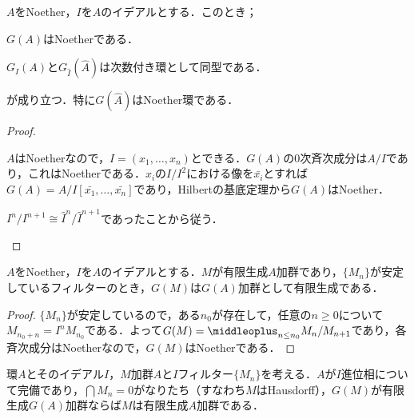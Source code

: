 \begin{prop}\label{prop:G(hat{A})はNoether}
	$A$をNoether，$I$を$A$のイデアルとする．このとき；
	\begin{sakura}
		\item $G(A)$はNoetherである．
		\item $G_I(A)$と$G_{\widehat{I}}(\widehat{A})$は次数付き環として同型である．
	\end{sakura}
	が成り立つ．特に$G(\widehat{A})$はNoether環である．
\end{prop}

\begin{proof}
	\begin{sakura}
		\item $A$はNoetherなので，$I=(x_1,\dots, x_n)$とできる．$G(A)$の$0$次斉次成分は$A/I$であり，これはNoetherである．$x_i$の$I/I^2$における像を$\bar{x_i}$とすれば$G(A)=A/I[\bar{x_1},\dots,\bar{x_n}]$であり，Hilbertの基底定理から$G(A)$はNoether．
		
		\item $I^n/I^{n+1}\cong\widehat{I}^n/\widehat{I}^{n+1}$であったことから従う．
	\end{sakura}
\end{proof}

\begin{prop}\label{prop:フィルターが安定していればG(M)は有限生成}
	$A$をNoether，$I$を$A$のイデアルとする．$M$が有限生成$A$加群であり，$\{M_n\}$が安定しているフィルターのとき，$G(M)$は$G(A)$加群として有限生成である．
\end{prop}

\begin{proof}
	$\{M_n\}$が安定しているので，ある$n_0$が存在して，任意の$n\geq0$について$M_{n_0+n}=I^nM_{n_0}$である．よって$G(M)=\middleoplus_{n\leq n_0}M_n/M_{n+1}$であり，各斉次成分はNoetherなので，$G(M)$はNoetherである．
\end{proof}

\begin{prop}
	環$A$とそのイデアル$I$，$M$加群$A$と$I$フィルター$\{M_n\}$を考える．$A$が$I$進位相について完備であり，$\bigcap M_n=0$がなりたち（すなわち$M$はHausdorff），$G(M)$が有限生成$G(A)$加群ならば$M$は有限生成$A$加群である．
\end{prop}

